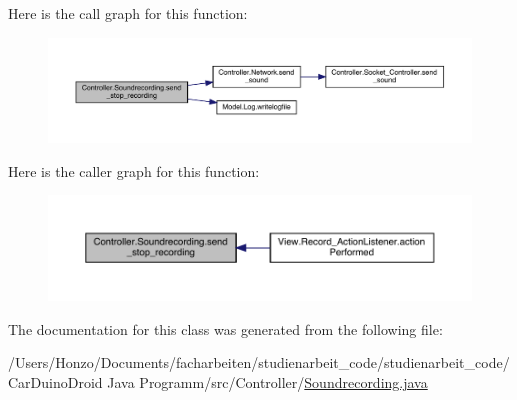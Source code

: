 Here is the call graph for this function\+:
\nopagebreak
\begin{figure}[H]
\begin{center}
\leavevmode
\includegraphics[width=350pt]{class_controller_1_1_soundrecording_a9cdfc2b331d3559ea510e1ccf0d36226_cgraph}
\end{center}
\end{figure}




Here is the caller graph for this function\+:
\nopagebreak
\begin{figure}[H]
\begin{center}
\leavevmode
\includegraphics[width=350pt]{class_controller_1_1_soundrecording_a9cdfc2b331d3559ea510e1ccf0d36226_icgraph}
\end{center}
\end{figure}




The documentation for this class was generated from the following file\+:\begin{DoxyCompactItemize}
\item 
/\+Users/\+Honzo/\+Documents/facharbeiten/studienarbeit\+\_\+code/studienarbeit\+\_\+code/\+Car\+Duino\+Droid Java Programm/src/\+Controller/\hyperlink{_soundrecording_8java}{Soundrecording.\+java}\end{DoxyCompactItemize}
